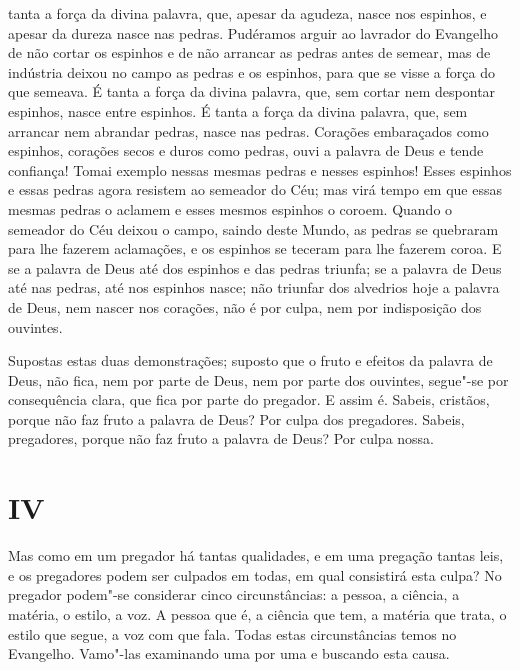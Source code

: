 tanta a força da divina palavra, que, apesar da agudeza, nasce nos
espinhos, e apesar da dureza nasce nas pedras.
Pudéramos arguir ao lavrador do Evangelho de não cortar os espinhos e de
não arrancar as pedras antes de semear, mas de indústria deixou no
campo as pedras e os espinhos, para que se visse a força do que semeava.
É tanta a força da divina palavra, que, sem cortar nem despontar
espinhos, nasce entre espinhos. É tanta a força da divina palavra, que,
sem arrancar nem abrandar pedras, nasce nas pedras. Corações embaraçados
como espinhos, corações secos e duros como pedras, ouvi a palavra de
Deus e tende confiança! Tomai exemplo nessas mesmas pedras e nesses
espinhos! Esses espinhos e essas pedras agora resistem ao semeador do
Céu; mas virá tempo em que essas mesmas pedras o aclamem e esses mesmos
espinhos o coroem.
Quando o semeador do Céu deixou o campo, saindo deste Mundo, as pedras
se quebraram para lhe fazerem aclamações, e os espinhos se teceram para
lhe fazerem coroa. E se a palavra de Deus até dos espinhos e das pedras
triunfa; se a palavra de Deus até nas pedras, até nos espinhos nasce;
não triunfar dos alvedrios hoje a palavra de Deus, nem nascer nos
corações, não é por culpa, nem por indisposição dos ouvintes.

Supostas estas duas demonstrações; suposto que o fruto e efeitos da
palavra de Deus, não fica, nem por parte de Deus, nem por parte dos
ouvintes, segue"-se por consequência clara, que fica por parte do
pregador. E assim é. Sabeis, cristãos, porque não faz fruto a palavra de
Deus? Por culpa dos pregadores. Sabeis, pregadores, porque não faz
fruto a palavra de Deus? Por culpa nossa.

\section*{IV}

Mas como em um pregador há tantas qualidades, e em uma pregação tantas
leis, e os pregadores podem ser culpados em todas,
em qual consistirá esta culpa? No pregador podem"-se considerar
cinco circunstâncias: a pessoa, a ciência, a matéria, o estilo, a voz. A
pessoa que é, a ciência que tem, a matéria que trata, o estilo que
segue, a voz com que fala. Todas estas circunstâncias temos no
Evangelho. Vamo"-las examinando uma por uma e buscando esta causa.

